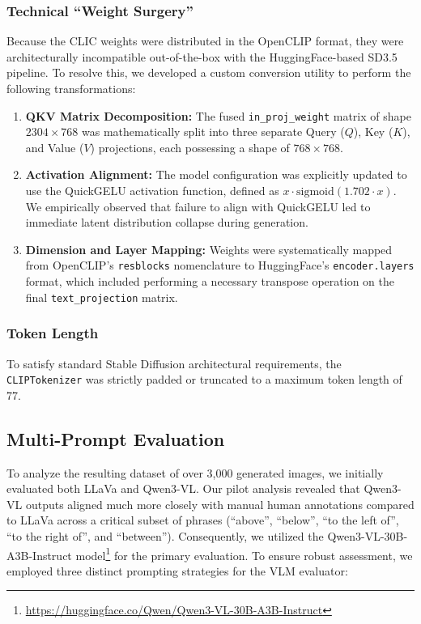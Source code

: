 \subsubsection{Technical ``Weight Surgery''}
Because the CLIC weights were distributed in the OpenCLIP format, they were architecturally incompatible out-of-the-box with the HuggingFace-based SD3.5 pipeline. To resolve this, we developed a custom conversion utility to perform the following transformations:

\begin{enumerate}
    \item \textbf{QKV Matrix Decomposition:} The fused \texttt{in\_proj\_weight} matrix of shape $2304 \times 768$ was mathematically split into three separate Query ($Q$), Key ($K$), and Value ($V$) projections, each possessing a shape of $768 \times 768$.
    \item \textbf{Activation Alignment:} The model configuration was explicitly updated to use the QuickGELU activation function, defined as $x \cdot \text{sigmoid}(1.702 \cdot x)$. We empirically observed that failure to align with QuickGELU led to immediate latent distribution collapse during generation.
    \item \textbf{Dimension and Layer Mapping:} Weights were systematically mapped from OpenCLIP's \texttt{resblocks} nomenclature to HuggingFace's \texttt{encoder.layers} format, which included performing a necessary transpose operation on the final \texttt{text\_projection} matrix.
\end{enumerate}

\subsubsection{Token Length}
To satisfy standard Stable Diffusion architectural requirements, the \texttt{CLIPTokenizer} was strictly padded or truncated to a maximum token length of 77.

\subsection{Multi-Prompt Evaluation}
To analyze the resulting dataset of over 3,000 generated images, we initially evaluated both LLaVa \citep{liu2023visualinstructiontuning} and Qwen3-VL. Our pilot analysis revealed that Qwen3-VL outputs aligned much more closely with manual human annotations compared to LLaVa \citep{chen2025why} across a critical subset of phrases (``above'', ``below'', ``to the left of'', ``to the right of'', and ``between''). Consequently, we utilized the Qwen3-VL-30B-A3B-Instruct model\footnote{\url{https://huggingface.co/Qwen/Qwen3-VL-30B-A3B-Instruct}} for the primary evaluation. To ensure robust assessment, we employed three distinct prompting strategies \citep{liu2023designguidelinespromptengineering} for the VLM evaluator:


